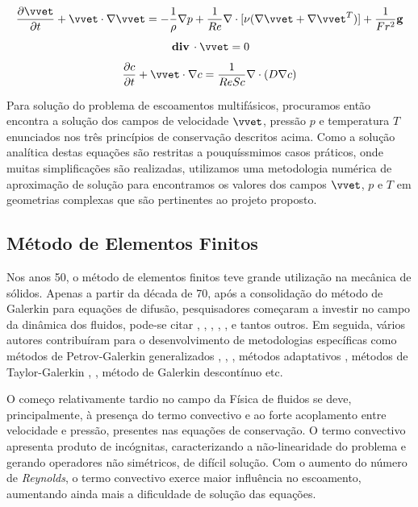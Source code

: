 \documentclass[a4paper,portuges]{article}
\newcommand{\diverg}{{\,\rm \bf div}\,}
\begin{document}
	\begin{equation}
		\frac{\partial \vvet}{\partial t} + \vvet \cdot \nabla \vvet
		=
		-\frac{1}{\rho} \nabla p + \frac{1}{Re} \nabla \cdot
		[\nu ( \nabla \vvet + \nabla \vvet^T)]+
		\frac{1}{Fr^2} \mathbf{g}
		\label{eq:final1}
	\end{equation}
	\begin{equation}
		\diverg \cdot \vvet = 0
		\label{eq:final2} 
	\end{equation}	
	\begin{equation}
		\frac{\partial c}{\partial t} + \vvet \cdot \nabla c
		=
		\frac{1}{ReSc} \nabla \cdot (D \nabla c)
		\label{eq:final3}
	\end{equation}\vspace{0.5cm}

Para solução do problema de escoamentos multifásicos, procuramos então
encontra a solução dos campos de velocidade $\vvet$, pressão $p$ e
temperatura $T$ enunciados nos três princípios de conservação descritos
acima. Como a solução analítica destas equações são restritas a
pouquíssmimos casos práticos, onde muitas simplificações são realizadas,
utilizamos uma metodologia numérica de aproximação de solução para
encontramos os valores dos campos $\vvet$, $p$ e $T$ em geometrias
complexas que são pertinentes ao projeto proposto. 


\subsection{Método de Elementos Finitos}
Nos anos 50, o método de elementos finitos teve grande utilização na
mecânica de sólidos.  Apenas a partir da década de 70, após a
consolidação do método de Galerkin para equações de difusão,
pesquisadores começaram a investir no campo da dinâmica dos fluidos,
pode-se citar \cite{zienkiewicz1965}, \cite{oden1972}, \cite{oden1998},
\cite{chung1978}, \cite{hughes1982}, \cite{pironneau1989} e tantos
outros.  Em seguida, vários autores contribuíram para o desenvolvimento
de metodologias específicas como métodos de Petrov-Galerkin
generalizados \cite{heinrich1977}, \cite{hughes1986},
\cite{johnson1987}, métodos adaptativos \cite{oden1989}, métodos de
Taylor-Galerkin \cite{donea1984}, \cite{lohner1985}, método de Galerkin
descontínuo \cite{oden1998} etc.

O começo relativamente tardio no campo da Física de fluidos se deve,
principalmente, à presença do termo convectivo e ao forte acoplamento
entre velocidade e pressão, presentes nas equações de conservação. O
termo convectivo apresenta produto de incógnitas, caracterizando a
não-linearidade do problema e gerando operadores não simétricos, de
difícil solução.  Com o aumento do número de \emph{Reynolds}, o termo
convectivo exerce maior influência no escoamento, aumentando ainda mais
a dificuldade de solução das equações.
\end{document}
